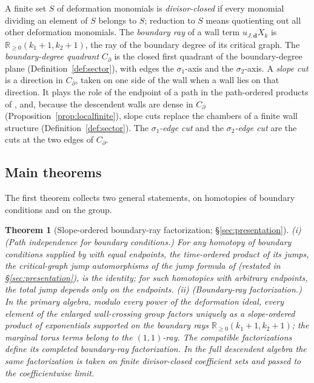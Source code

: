 \documentclass[11pt]{amsart}
\newtheorem{theorem}{Theorem}[section]
\theoremstyle{definition}
\theoremstyle{remark}
\newcommand{\RR}{\mathbb{R}}
\begin{document}
A
finite set $S$ of deformation monomials is \emph{divisor-closed} if every
monomial dividing an element of $S$ belongs to $S$; reduction to $S$ means
quotienting out all other deformation monomials.  The \emph{boundary ray} of
a wall term $u_{J,\mathbf d}X_{k}$ is $\RR_{\ge0}(k_1+1,k_2+1)$, the ray of the
boundary degree of its critical graph.  The \emph{boundary-degree quadrant}
$C_\partial$ is the closed first quadrant of the boundary-degree plane
(Definition~\ref{def:sector}), with edges the $\sigma_1$-axis and the
$\sigma_2$-axis.  A \emph{slope cut} is a direction in $C_\partial$, taken on
one side of the wall when a wall lies on that direction.  It plays the role of
the endpoint of a path in the path-ordered products of \cite{GPS10}, and,
because the descendent walls are dense in $C_\partial$
(Proposition~\ref{prop:localfinite}), slope cuts replace the chambers of a
finite wall structure (Definition~\ref{def:sector}).  The
\emph{$\sigma_1$-edge cut} and the \emph{$\sigma_2$-edge cut} are the cuts at
the two edges of $C_\partial$.

\subsection*{Main theorems}
The first theorem collects two general statements, on homotopies of boundary
conditions and on the group.

\begin{theorem}[Slope-ordered boundary-ray factorization; \S\ref{sec:presentation}]
\label{thm:presentation}
(i) (Path independence for boundary conditions.) For any homotopy of
boundary conditions supplied by \cite[Lem.~3.40]{GKT} with equal endpoints,
the time-ordered
product of its jumps, the critical-graph jump automorphisms of the jump formula
of \cite[proof of Thm.~5.9]{GKT} (restated in \S\ref{sec:presentation}), is
the identity; for such homotopies with arbitrary endpoints, the total jump
depends only on the endpoints. (ii) (Boundary-ray factorization.) In the primary
algebra, modulo every power of the deformation ideal, every element of the
enlarged wall-crossing group factors uniquely as a slope-ordered product of
exponentials supported on the boundary rays
$\RR_{\ge0}(k_{1}{+}1,k_{2}{+}1)$; the marginal torus terms belong to the
$(1,1)$-ray. The compatible factorizations define its completed boundary-ray
factorization. In the full descendent algebra the same factorization is taken
on finite divisor-closed coefficient sets and passed to the coefficientwise
limit.
\end{theorem}
\end{document}
